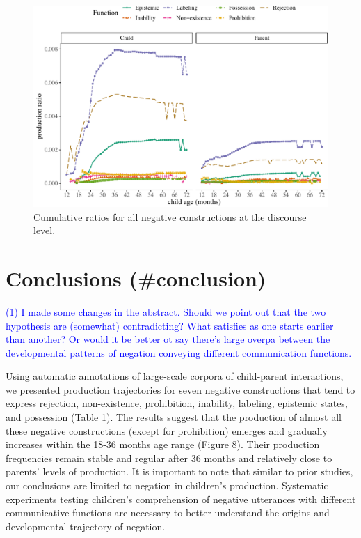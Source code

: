 \documentclass[
  english,
  man,floatsintext]{apa6}
\begin{document}
\begin{figure}[H]

{\centering \includegraphics{neg_construction_article_files/figure-latex/alldiscourse-1} 

}

\caption{Cumulative ratios for all negative constructions at the discourse level.}\label{fig:alldiscourse}
\end{figure}

\hypertarget{conclusions-conclusion}{%
\section{Conclusions (\#conclusion)}\label{conclusions-conclusion}}

\textcolor{blue}{(1) I made some changes in the abstract. Should we point out that the two hypothesis are (somewhat) contradicting? What satisfies as one starts earlier than another? Or would it be better ot say there's large overpa between the developmental patterns of negation conveying different communication functions.}

Using automatic annotations of large-scale corpora of child-parent interactions, we presented production trajectories for seven negative constructions that tend to express rejection, non-existence, prohibition, inability, labeling, epistemic states, and possession (Table 1). The results suggest that the production of almost all these negative constructions (except for prohibition) emerges and gradually increases within the 18-36 months age range (Figure 8). Their production frequencies remain stable and regular after 36 months and relatively close to parents' levels of production. It is important to note that similar to prior studies, our conclusions are limited to negation in children's production. Systematic experiments testing children's comprehension of negative utterances with different communicative functions are necessary to better understand the origins and developmental trajectory of negation.
\end{document}
